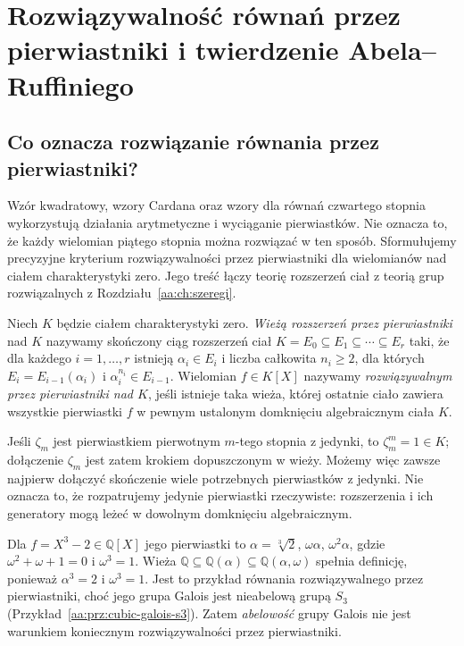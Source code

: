 \chapter[Rozwiązywalność przez pierwiastniki]{Rozwiązywalność równań przez pierwiastniki i twierdzenie Abela--Ruffiniego}
\label{aa:ch:radical-solvability}
\label{aa:ch:radicals}

\section{Co oznacza rozwiązanie równania przez pierwiastniki?}
Wzór kwadratowy, wzory Cardana oraz wzory dla równań
czwartego stopnia wykorzystują działania arytmetyczne i
wyciąganie pierwiastków. Nie oznacza to, że każdy wielomian
piątego stopnia można rozwiązać w ten sposób.
Sformułujemy precyzyjne kryterium rozwiązywalności przez
pierwiastniki dla wielomianów nad ciałem charakterystyki zero.
Jego treść łączy teorię rozszerzeń ciał z teorią grup rozwiązalnych
z Rozdziału~\ref{aa:ch:szeregi}.

\begin{definicja}
\label{aa:def:radical-tower}
\label{aa:def:radical-extension}
Niech $K$ będzie ciałem charakterystyki zero.
\emph{Wieżą rozszerzeń przez pierwiastniki} nad $K$ nazywamy
skończony ciąg rozszerzeń ciał
$K=E_0\subseteq E_1\subseteq\cdots\subseteq E_r$
taki, że dla każdego $i=1,\ldots,r$ istnieją
$\alpha_i\in E_i$ i liczba całkowita $n_i\ge2$, dla których
$E_i=E_{i-1}(\alpha_i)$ i $\alpha_i^{n_i}\in E_{i-1}$.
Wielomian $f\in K[X]$ nazywamy \emph{rozwiązywalnym przez
pierwiastniki nad $K$}, jeśli istnieje taka wieża, której
ostatnie ciało zawiera wszystkie pierwiastki $f$
w pewnym ustalonym domknięciu algebraicznym ciała $K$.
\end{definicja}

\begin{uwaga}
\label{aa:uw:radicals-roots-unity}
Jeśli $\zeta_m$ jest pierwiastkiem pierwotnym $m$-tego stopnia
z jedynki, to $\zeta_m^m=1\in K$; dołączenie $\zeta_m$
jest zatem krokiem dopuszczonym w wieży. Możemy więc zawsze
najpierw dołączyć skończenie wiele potrzebnych pierwiastków
z jedynki. Nie oznacza to, że rozpatrujemy jedynie
pierwiastki rzeczywiste: rozszerzenia i ich generatory
mogą leżeć w dowolnym domknięciu algebraicznym.
\end{uwaga}

\begin{przyklad}
\label{aa:prz:radical-cubic-simple}
Dla $f=X^3-2\in\mathbb Q[X]$ jego pierwiastki to
$\alpha=\sqrt[3]2$, $\omega\alpha$, $\omega^2\alpha$,
gdzie $\omega^2+\omega+1=0$ i $\omega^3=1$.
Wieża
$\mathbb Q\subseteq\mathbb Q(\alpha)
\subseteq\mathbb Q(\alpha,\omega)$
spełnia definicję, ponieważ $\alpha^3=2$ i $\omega^3=1$.
Jest to przykład równania rozwiązywalnego przez pierwiastniki,
choć jego grupa Galois jest nieabelową grupą $S_3$
(Przykład~\ref{aa:prz:cubic-galois-s3}).
Zatem \emph{abelowość} grupy Galois nie jest
warunkiem koniecznym rozwiązywalności przez pierwiastniki.
\end{przyklad}

